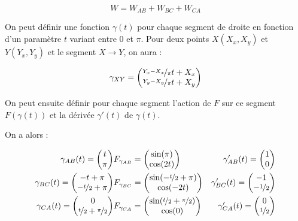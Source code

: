 \documentclass[a4paper, 11pt]{report} %
\begin{document}
\[ W = W_{AB} + W_{BC} + W_{CA} \]

On peut définir une fonction $\gamma(t)$ pour chaque segment de droite en fonction d'un paramètre $t$ variant entre $0$
et $\pi$. Pour deux points $X(X_x, X_y)$ et $Y(Y_x, Y_y)$ et le segment $X \rightarrow Y$, on aura :

\[
\gamma_{XY} =
\begin{pmatrix}
\nicefrac{Y_x - X_x}{\pi}t+X_x\\
\nicefrac{Y_y - X_y}{\pi}t+X_y
\end{pmatrix}
\]

On peut ensuite définir pour chaque segment l'action de $F$ sur ce segment $F(\gamma(t))$ et la dérivée $\gamma'(t)$ de
$\gamma(t)$.

On a alors :

\begin{eqnarray*}
\gamma_{AB}(t) =
\begin{pmatrix}
t\\
\pi
\end{pmatrix} &
F_{\gamma_{AB}} = 
\begin{pmatrix}
\sin(\pi)\\
\cos(2t)
\end{pmatrix} &
\gamma'_{AB}(t) =
\begin{pmatrix}
1\\
0
\end{pmatrix}\\ %
\gamma_{BC}(t) =
\begin{pmatrix}
-t+\pi\\
-\nicefrac{t}{2}+\pi
\end{pmatrix} &
F_{\gamma_{BC}} = 
\begin{pmatrix}
\sin(-\nicefrac{t}{2}+\pi)\\
\cos(-2t)
\end{pmatrix} &
\gamma'_{BC}(t) =
\begin{pmatrix}
-1\\
-\nicefrac{1}{2}
\end{pmatrix}\\ %
\gamma_{CA}(t) =
\begin{pmatrix}
0\\
\nicefrac{t}{2} +\nicefrac{\pi}{2}
\end{pmatrix} &
F_{\gamma_{CA}} = 
\begin{pmatrix}
\sin(\nicefrac{t}{2} +\nicefrac{\pi}{2})\\
\cos(0)
\end{pmatrix} &
\gamma'_{CA}(t) =
\begin{pmatrix}
0\\
\nicefrac{1}{2}
\end{pmatrix}
\end{eqnarray*}
\end{document}
